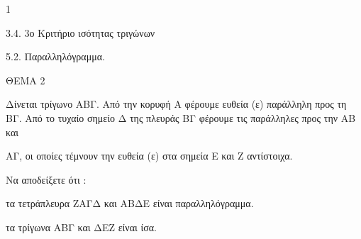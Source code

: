 \begin{ylh}{1}
    \item 3.4. 3ο Κριτήριο ισότητας τριγώνων
    \item 5.2. Παραλληλόγραμμα.
\end{ylh}

ΘΕΜΑ 2

Δίνεται τρίγωνο ΑΒΓ. Από την κορυφή Α φέρουμε ευθεία (ε) παράλληλη προς τη ΒΓ. Από το τυχαίο σημείο Δ της πλευράς ΒΓ φέρουμε τις παράλληλες προς την ΑΒ και

ΑΓ, οι οποίες τέμνουν την ευθεία (ε) στα σημεία Ε και Ζ αντίστοιχα.

Να αποδείξετε ότι :

\begin{alist}
\item τα τετράπλευρα ΖΑΓΔ και ΑΒΔΕ είναι παραλληλόγραμμα. 

\item τα τρίγωνα ΑΒΓ και ΔΕΖ είναι ίσα. 


\begin{center}
\end{center}
\end{alist}
